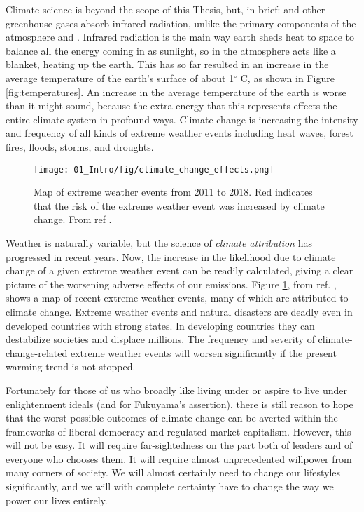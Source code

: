 Climate science is beyond the scope of this Thesis, but, in brief:  and other greenhouse gases absorb infrared radiation, unlike the primary components of the atmosphere  and . Infrared radiation is the main way earth sheds heat to space to balance all the energy coming in as sunlight, so  in the atmosphere acts like a blanket, heating up the earth. This has so far resulted in an increase in the average temperature of the earth's surface of about 1$^\circ$ C, as shown in Figure \ref{fig:temperatures}. An increase in the average temperature of the earth is worse than it might sound, because the extra energy that this represents effects the entire climate system in profound ways. Climate change is increasing the intensity and frequency of all kinds of extreme weather events including heat waves, forest fires, floods, storms, and droughts\cite{IPCC2014, CarbonBrief}. 
\begin{figure}[h!]
	\centering
	\texttt{[image: 01\_Intro/fig/climate\_change\_effects.png]}
	\caption{Map of extreme weather events from 2011 to 2018. Red indicates that the risk of the extreme weather event was increased by climate change. From %
	ref .
}
	\label{fig:attribution}
\end{figure}
Weather is naturally variable, but the science of \textit{climate attribution} has progressed in recent years. Now, the increase in the likelihood due to climate change of a given extreme weather event can be readily calculated, giving a clear picture of the worsening adverse effects of our emissions\cite{Schiermeier2018}. Figure \ref{fig:attribution}, from ref. , shows a map of recent extreme weather events, many of which are attributed to climate change. Extreme weather events and natural disasters are deadly even in developed countries with strong states. In developing countries they can destabilize societies and displace millions\cite{UNHCR2019}. The frequency and severity of climate-change-related extreme weather events will worsen significantly if the present warming trend is not stopped\cite{IPCC2018_SPM}. 

Fortunately for those of us who broadly like living under or aspire to live under enlightenment ideals (and for Fukuyama's assertion), there is still reason to hope that the worst possible outcomes of climate change can be averted within the frameworks of liberal democracy and regulated market capitalism. However, this will not be easy. It will require far-sightedness on the part both of leaders and of everyone who chooses them. It will require almost unprecedented willpower from many corners of society. We will almost certainly need to change our lifestyles significantly, and we will with complete certainty have to change the way we power our lives entirely. 

